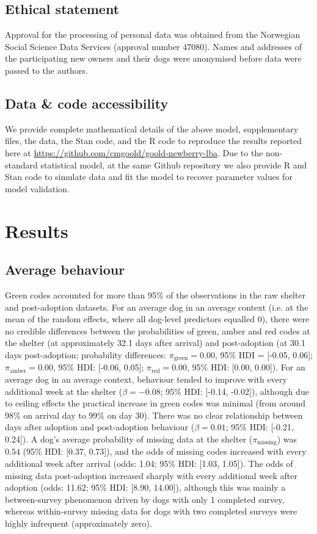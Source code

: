 \documentclass[fleqn,10pt]{wlscirep}
\begin{document}
\subsection*{Ethical statement}
Approval for the processing of personal data was obtained from the Norwegian Social Science Data Services (approval number 47080). Names and addresses of the participating new owners and their dogs were anonymised before data were passed to the authors.

\subsection*{Data \& code accessibility}
We provide complete mathematical details of the above model, supplementary files, the data, the Stan code, and the R code to reproduce the results reported here at \url{https://github.com/cmgoold/goold-newberry-lba}. Due to the non-standard statistical model, at the same Github repository we also provide R and Stan code to simulate data and fit the model to recover parameter values for model validation. 

\section*{Results}

\subsection*{Average behaviour}
Green codes accounted for more than 95\% of the observations in the raw shelter and post-adoption datasets. For an average dog in an average context (i.e. at the mean of the random effects, where all dog-level predictors equalled 0), there were no credible differences between the probabilities of green, amber and red codes at the shelter (at approximately 32.1 days after arrival) and post-adoption (at 30.1 days post-adoption; probability differences: $\pi_{\text{green}} = 0.00$, 95\% HDI = [-0.05, 0.06]; $\pi_{\text{amber}} = 0.00$, 95\% HDI: [-0.06, 0.05]; $\pi_{\text{red}} = 0.00$, 95\% HDI: [0.00, 0.00]). For an average dog in an average context, behaviour tended to improve with every additional week at the shelter ($\beta = -0.08$; 95\% HDI: [-0.14, -0.02]), although due to ceiling effects the practical increase in green codes was minimal (from around 98\% on arrival day to 99\% on day 30). There was no clear relationship between days after adoption and post-adoption behaviour ($\beta = 0.01$; 95\% HDI: [-0.21, 0.24]). A dog's average probability of missing data at the shelter ($\pi_{\text{missing}}$) was $0.54$ (95\% HDI: [0.37, 0.73]), and the odds of missing codes increased with every additional week after arrival (odds: 1.04; 95\% HDI: [1.03, 1.05]). The odds of missing data post-adoption increased sharply with every additional week after adoption (odds: 11.62; 95\% HDI: [8.90, 14.00]), although this was mainly a between-survey phenomenon driven by dogs with only 1 completed survey, whereas within-survey missing data for dogs with two completed surveys were highly infrequent (approximately zero).
\end{document}
